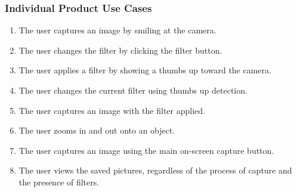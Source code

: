 \documentclass[12pt, titlepage]{article}
\begin{document}

\subsubsection{Individual Product Use Cases}
{\color{red}
\begin{enumerate}[{UC}1.]
\item The user captures an image by smiling at the camera. \\
\item The user changes the filter by clicking the filter button.\\
\item The user applies a filter by showing a thumbs up toward the camera.
\item The user changes the current filter using thumbs up detection.
\item The user captures an image with the filter applied. 
\item The user zooms in and out onto an object.
\item The user captures an image using the main on-screen capture button.
\item The user views the saved pictures, regardless of the process of capture and the presence of filters. 
\end{enumerate}
}
\end{document}
